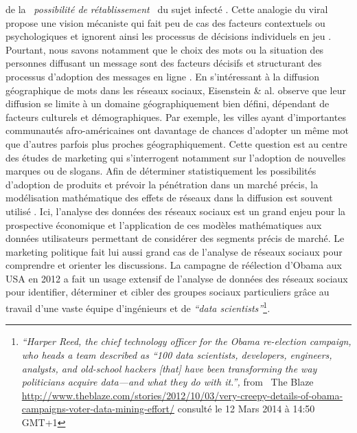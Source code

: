de la \textit{{\guillemotleft}~possibilit\'e de
}\textit{r\'etablissement~{\guillemotright} }du sujet infect\'e \citep{Wang2011}. Cette analogie du viral propose une vision
m\'ecaniste qui fait peu de cas des facteurs contextuels ou
psychologiques et ignorent ainsi les processus de d\'ecisions
individuels en jeu \citep{Jackson2010}. Pourtant, nous savons
notamment que le choix des mots ou la situation des personnes diffusant
un message sont des facteurs d\'ecisifs et structurant des processus
d{\textquoteright}adoption des messages en ligne \citep{Conover2013}. 
En s{\textquoteright}int\'eressant \`a la diffusion
g\'eographique de mots dans les r\'eseaux sociaux, Eisenstein \& al.
\citep{Eisenstein2012} observe que leur diffusion se limite \`a un domaine
g\'eographiquement bien d\'efini, d\'ependant de facteurs culturels et
d\'emographiques. Par exemple, les villes ayant
d{\textquoteright}importantes communaut\'es afro-am\'ericaines ont
davantage de chances d{\textquoteright}adopter un m\^eme mot que
d{\textquoteright}autres parfois plus proches g\'eographiquement. Cette
question est au centre des \'etudes de marketing qui
s{\textquoteright}interrogent notamment sur l{\textquoteright}adoption
de nouvelles marques ou de slogans. Afin de d\'eterminer
statistiquement les possibilit\'es d{\textquoteright}adoption de
produits et pr\'evoir la p\'en\'etration dans un march\'e pr\'ecis, la
mod\'elisation math\'ematique des effets de r\'eseaux dans la diffusion
est souvent utilis\'e \citep{Bass1994}. Ici,
l{\textquoteright}analyse des donn\'ees des r\'eseaux sociaux est un
grand enjeu pour la prospective \'economique et
l{\textquoteright}application de ces mod\`eles math\'ematiques aux
donn\'ees utilisateurs permettant de consid\'erer des segments pr\'ecis
de march\'e. Le marketing politique fait lui aussi grand cas de
l{\textquoteright}analyse de r\'eseaux sociaux pour comprendre et
orienter les discussions. La campagne de r\'e\'election
d{\textquoteright}Obama aux USA en 2012 a fait un usage extensif de
l{\textquoteright}analyse de donn\'ees des r\'eseaux sociaux pour
identifier, d\'eterminer et cibler des groupes sociaux particuliers
gr\^ace au travail d{\textquoteright}une vaste \'equipe
d{\textquoteright}ing\'enieurs et de \textit{{\textquotedblleft}data
scientists{\textquotedblright}}\footnote{
\textit{{\textquotedblleft}Harper Reed, the chief technology officer
for the Obama re-election campaign, who heads a team described as
{\textquotedblleft}100 data scientists, developers, engineers,
analysts, and old-school hackers [that] have been transforming the way
politicians acquire data---and what they do with
it.{\textquotedblright}, }from \ The Blaze
\url{http://www.theblaze.com/stories/2012/10/03/very-creepy-details-of-obama-campaigns-voter-data-mining-effort/}
consult\'e le 12 Mars 2014 \`a 14:50 GMT+1}\textit{. }


